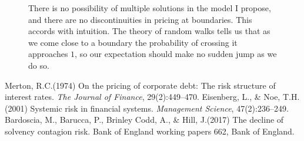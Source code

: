 \documentclass[11pt, a4paper]{article}
\begin{document}
\begin{figure}[!htp]
  \centering
  
  
  \caption{There is no possibility of multiple solutions in the model I
    propose, and there are no discontinuities in pricing at boundaries. This
    accords with intuition. The theory of random walks tells us that as we come close to a
    boundary the probability of crossing it approaches $1$, so our expectation
    should make no sudden jump as we do so.}
\end{figure}

\begin{thebibliography}{9}
Merton, R.\@ C.\@ (1974) On the pricing of corporate debt: The risk structure of interest rates. \emph{The Journal of Finance}, 29(2):449--470.
Eisenberg, L., \& Noe, T.\@ H.\@ (2001) Systemic risk in financial systems. \emph{Management
Science}, 47(2):236--249.
Bardoscia, M., Barucca, P., Brinley Codd, A., \& Hill, J.\@ (2017) The decline of solvency contagion risk. Bank of England working papers 662, Bank of England.
\end{thebibliography}
\end{document}
